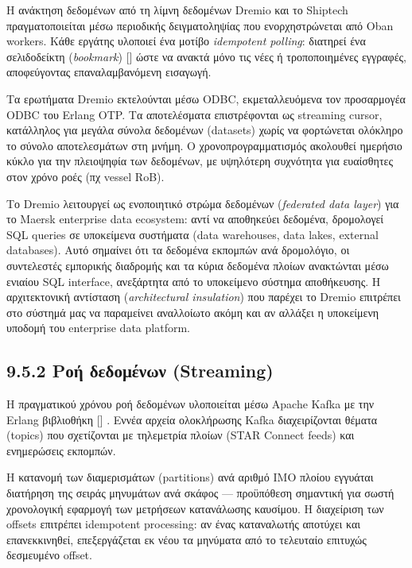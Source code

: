 \documentclass[11pt,a4paper,greek,twoside]{template-xe}
\let\origtexttt\texttt
\renewcommand{\texttt}[1]{%
  \begingroup
  \StrSubstitute{#1}{.}{.\allowbreak}[\tttmp]%
  \origtexttt{\tttmp}%
  \endgroup
}
\begin{document}
Η ανάκτηση δεδομένων από τη λίμνη δεδομένων Dremio και το Shiptech
πραγματοποιείται μέσω περιοδικής δειγματοληψίας που ενορχηστρώνεται από
Oban workers. Κάθε εργάτης υλοποιεί ένα μοτίβο \emph{idempotent
polling}: διατηρεί ένα σελιδοδείκτη (\emph{bookmark})
\texttt{last\_updated} ώστε να ανακτά μόνο τις νέες ή τροποποιημένες
εγγραφές, αποφεύγοντας επαναλαμβανόμενη εισαγωγή.

Τα ερωτήματα Dremio εκτελούνται μέσω ODBC, εκμεταλλευόμενα τον
προσαρμογέα ODBC του Erlang OTP. Τα αποτελέσματα επιστρέφονται ως
streaming cursor, κατάλληλος για μεγάλα σύνολα δεδομένων (datasets)
χωρίς να φορτώνεται ολόκληρο το σύνολο αποτελεσμάτων στη μνήμη. Ο
χρονοπρογραμματισμός ακολουθεί ημερήσιο κύκλο για την πλειοψηφία των
δεδομένων, με υψηλότερη συχνότητα για ευαίσθητες στον χρόνο ροές (πχ
vessel RoB).

Το Dremio λειτουργεί ως ενοποιητικό στρώμα δεδομένων (\emph{federated
data layer}) για το Maersk enterprise data ecosystem: αντί να αποθηκεύει
δεδομένα, δρομολογεί SQL queries σε υποκείμενα συστήματα (data
warehouses, data lakes, external databases). Aυτό σημαίνει ότι τα
δεδομένα εκπομπών ανά δρομολόγιο, οι συντελεστές εμπορικής διαδρομής και
τα κύρια δεδομένα πλοίων ανακτώνται μέσω ενιαίου SQL interface,
ανεξάρτητα από το υποκείμενο σύστημα αποθήκευσης. Η αρχιτεκτονική
αντίσταση (\emph{architectural insulation}) που παρέχει το Dremio
επιτρέπει στο σύστημά μας να παραμείνει αναλλοίωτο ακόμη και αν αλλάξει
η υποκείμενη υποδομή του enterprise data platform.

\subsection{9.5.2 Ροή δεδομένων
(Streaming)}\label{ux3c1ux3bfux3ae-ux3b4ux3b5ux3b4ux3bfux3bcux3adux3bdux3c9ux3bd-streaming}

Η πραγματικού χρόνου ροή δεδομένων υλοποιείται μέσω Apache Kafka με την
Erlang βιβλιοθήκη \texttt{:brod}. Εννέα αρχεία ολοκλήρωσης Kafka
διαχειρίζονται θέματα (topics) που σχετίζονται με τηλεμετρία πλοίων
(STAR Connect feeds) και ενημερώσεις εκπομπών.

Η κατανομή των διαμερισμάτων (partitions) ανά αριθμό IMO πλοίου εγγυάται
διατήρηση της σειράς μηνυμάτων ανά σκάφος --- προϋπόθεση σημαντική για
σωστή χρονολογική εφαρμογή των μετρήσεων κατανάλωσης καυσίμου. Η
διαχείριση των offsets επιτρέπει idempotent processing: αν ένας
καταναλωτής αποτύχει και επανεκκινηθεί, επεξεργάζεται εκ νέου τα
μηνύματα από το τελευταίο επιτυχώς δεσμευμένο offset.
\end{document}
